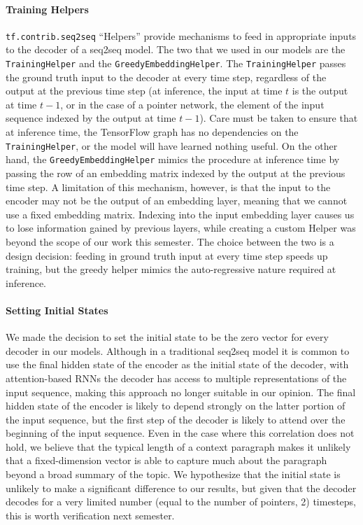 \documentclass{article}
\begin{document}
\paragraph{Training Helpers}
\texttt{tf.contrib.seq2seq} ``Helpers'' provide mechanisms to feed in appropriate inputs to the decoder of a seq2seq model. The two that we used in our models are the \texttt{TrainingHelper} and the \texttt{GreedyEmbeddingHelper}. The \texttt{TrainingHelper} passes the ground truth input to the decoder at every time step, regardless of the output at the previous time step (at inference, the input at time $t$ is the output at time $t-1$, or in the case of a pointer network, the element of the input sequence indexed by the output at time $t-1$). Care must be taken to ensure that at inference time, the TensorFlow graph has no dependencies on the \texttt{TrainingHelper}, or the model will have learned nothing useful. On the other hand, the \texttt{GreedyEmbeddingHelper} mimics the procedure at inference time by passing the row of an embedding matrix indexed by the output at the previous time step. A limitation of this mechanism, however, is that the input to the encoder may not be the output of an embedding layer, meaning that we cannot use a fixed embedding matrix. Indexing into the input embedding layer causes us to lose information gained by previous layers, while creating a custom Helper was beyond the scope of our work this semester. The choice between the two is a design decision: feeding in ground truth input at every time step speeds up training, but the greedy helper mimics the auto-regressive nature required at inference. 

\paragraph{Setting Initial States}
We made the decision to set the initial state to be the zero vector for every decoder in our models. Although in a traditional seq2seq model it is common to use the final hidden state of the encoder as the initial state of the decoder, with attention-based RNNs the decoder has access to multiple representations of the input sequence, making this approach no longer suitable in our opinion. The final hidden state of the encoder is likely to depend strongly on the latter portion of the input sequence, but the first step of the decoder is likely to attend over the beginning of the input sequence. Even in the case where this correlation does not hold, we believe that the typical length of a context paragraph makes it unlikely that a fixed-dimension vector is able to capture much about the paragraph beyond a broad summary of the topic. We hypothesize that the initial state is unlikely to make a significant difference to our results, but given that the decoder decodes for a very limited number (equal to the number of pointers, 2) timesteps, this is worth verification next semester.
\end{document}
